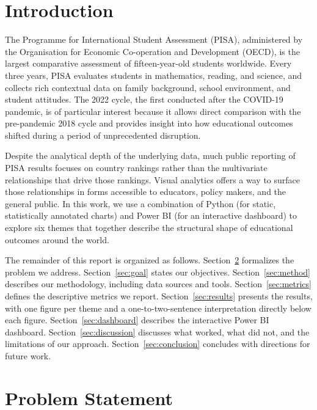 \documentclass[conference]{IEEEtran}
\begin{document}
\section{Introduction}
\label{sec:intro}

The Programme for International Student Assessment (PISA), administered by the Organisation for Economic Co-operation and Development (OECD), is the largest comparative assessment of fifteen-year-old students worldwide. Every three years, PISA evaluates students in mathematics, reading, and science, and collects rich contextual data on family background, school environment, and student attitudes. The 2022 cycle, the first conducted after the COVID-19 pandemic, is of particular interest because it allows direct comparison with the pre-pandemic 2018 cycle and provides insight into how educational outcomes shifted during a period of unprecedented disruption.

Despite the analytical depth of the underlying data, much public reporting of PISA results focuses on country rankings rather than the multivariate relationships that drive those rankings. Visual analytics offers a way to surface those relationships in forms accessible to educators, policy makers, and the general public. In this work, we use a combination of Python (for static, statistically annotated charts) and Power BI (for an interactive dashboard) to explore six themes that together describe the structural shape of educational outcomes around the world.

The remainder of this report is organized as follows. Section~\ref{sec:problem} formalizes the problem we address. Section~\ref{sec:goal} states our objectives. Section~\ref{sec:method} describes our methodology, including data sources and tools. Section~\ref{sec:metrics} defines the descriptive metrics we report. Section~\ref{sec:results} presents the results, with one figure per theme and a one-to-two-sentence interpretation directly below each figure. Section~\ref{sec:dashboard} describes the interactive Power BI dashboard. Section~\ref{sec:discussion} discusses what worked, what did not, and the limitations of our approach. Section~\ref{sec:conclusion} concludes with directions for future work.

\section{Problem Statement}
\label{sec:problem}
\end{document}
